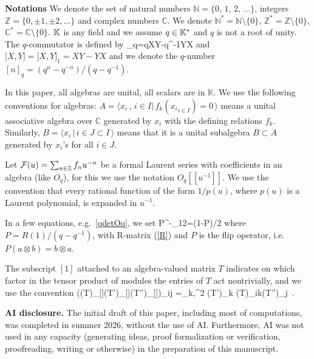 \documentclass[11pt]{amsart}
\numberwithin{equation}{section}
\numberwithin{equation}{section}
\begin{document}
\smallskip


{\bf Notations}
	We denote  the set of natural numbers ${\mathbb N} = \{0$, $1$, $2$, $\ldots\}$,  integers ${\mathbb Z} = \{0, \pm 1, \pm 2, \ldots\}$ and complex numbers ${\mathbb C}$. We denote ${\mathbb N}^* = {\mathbb N}\setminus\{0\}$, ${\mathbb Z}^* = {\mathbb Z}\setminus\{0\}$, ${\mathbb C}^* = {\mathbb C}\setminus\{0\}$.
	$\mathbb{K}$ is any field and we assume $q\in\mathbb{K}^*$ and  $q$ is not a root of unity. The $q$-commutator  is defined by
	\beqa
	\big[X,Y\big]_q=qXY-q^{-1}YX \label{defcom}
	\eeqa
	and $\big[X,Y\big]=\big[X,Y\big]_1=XY-YX$ and we denote the $q$-number $[n]_q= (q^n-q^{-n})/(q-q^{-1})$. 
	
	In this paper, all algebras are unital, all scalars are in ${\mathbb K}$. We use the following conventions for algebras: $A = \bigl\langle x_i \, , \,  i\in I \big|\, f_k({x_i}_{i\in I})=0\,\bigr\rangle$ means a unital associative algebra over $\mathbb{C}$ generated by $x_i$ with the defining relations $f_k$. Similarly,  $B = \bigl\langle x_i \, \big| \,  i\in J\subset I \,\bigr\rangle$
	means that it is  a unital subalgebra $B\subset A$ generated by $x_i$'s for all $i\in J$.
 
	Let 
    ${\cal F}(u)=\sum_{n\in \mathbb{Z}} f_n u^{-n}$
    be a formal Laurent series with coefficients in an algebra (like $O_q$), for this we use the notation $O_q[[u^{-1}]]$.
	We use the convention that every rational function of the form $1/p(u)$, where $p(u)$ is a Laurent polynomial, is expanded in $u^{-1}$.

In a few equations, e.g.~\eqref{qdetOq}, we set
			\beqa
			{\cal P}^{-}_{12}=(1-P)/2 \label{eq:P12}
			\eeqa
			where $P=R(1)/(q-q^{-1})$,
		with R-matrix (\ref{R}) and $P$ is the flip operator, i.e.\ $P(a\otimes b) = b\otimes a$.
	
	The subscript $[1]$ attached to an algebra-valued matrix $T$ indicates on which factor in the tensor
product of modules the entries of $T$ act nontrivially, and we use the convention 
\beqa
((T)_{[]}(T')_{[]}(T'')_{[]})_{ij}
		=\sum_{k,}^2 (T')_{k\ell} \otimes  (T)_{ik}(T'')_{\ell j}\ .\label{eq:TTT}
\eeqa	

{\bf AI disclosure.} The initial draft of this paper, including most of computations, was completed in
summer 2026, without the use of AI. Furthermore, AI was not used in any capacity (generating ideas, proof formalization or verification, proofreading, writing or otherwise) in the preparation of this manuscript.
\end{document}
